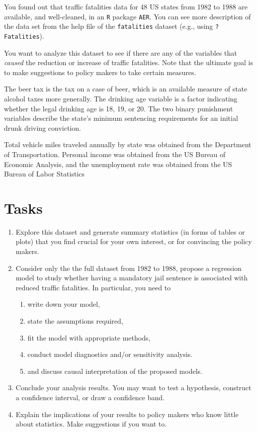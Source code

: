 \documentclass[12pt,]{book}
\providecommand{\tightlist}{%
  \setlength{\itemsep}{0pt}\setlength{\parskip}{0pt}}
\begin{document}
You found out that traffic fatalities data for 48 US states from 1982 to
1988 are available, and well-cleaned, in an \texttt{R} package
\texttt{AER}. You can see more description of the data set from the help
file of the \texttt{fatalities} dataset (e.g., using
\texttt{?Fatalities}).

You want to analyze this dataset to see if there are any of the
variables that \emph{caused} the reduction or increase of traffic
fatalities. Note that the ultimate goal is to make suggestions to policy
makers to take certain measures.

The beer tax is the tax on a case of beer, which is an available measure
of state alcohol taxes more generally. The drinking age variable is a
factor indicating whether the legal drinking age is 18, 19, or 20. The
two binary punishment variables describe the state's minimum sentencing
requirements for an initial drunk driving conviction.

Total vehicle miles traveled annually by state was obtained from the
Department of Transportation. Personal income was obtained from the US
Bureau of Economic Analysis, and the unemployment rate was obtained from
the US Bureau of Labor Statistics

\section{Tasks}\label{tasks-2}

\begin{enumerate}
\def\labelenumi{\arabic{enumi}.}
\item
  Explore this dataset and generate summary statistics (in forms of
  tables or plots) that you find crucial for your own interest, or for
  convincing the policy makers.
\item
  Consider only the the full dataset from 1982 to 1988, propose a
  regression model to study whether having a mandatory jail sentence is
  associated with reduced traffic fatalities. In particular, you need to

  \begin{enumerate}
  \def\labelenumii{\alph{enumii}.}
  \tightlist
  \item
    write down your model,
  \item
    state the assumptions required,
  \item
    fit the model with appropriate methods,
  \item
    conduct model diagnostics and/or sensitivity analysis.
  \item
    and discuss causal interpretation of the proposed models.
  \end{enumerate}
\item
  Conclude your analysis results. You may want to test a hypothesis,
  construct a confidence interval, or draw a confidence band.
\item
  Explain the implications of your results to policy makers who know
  little about statistics. Make suggestions if you want to.
\end{enumerate}
\end{document}
